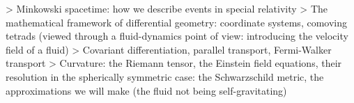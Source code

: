 \documentclass[main.tex]{subfiles}
\begin{document}
> Minkowski spacetime: how we describe events in special relativity
> The mathematical framework of differential geometry: coordinate systems, comoving tetrads (viewed through a fluid-dynamics point of view: introducing the velocity field of a fluid)
> Covariant differentiation, parallel transport, Fermi-Walker transport
> Curvature: the Riemann tensor, the Einstein field equations, their resolution in the spherically symmetric case: the Schwarzschild metric, the approximations we will make (the fluid not being self-gravitating)
\end{document}
